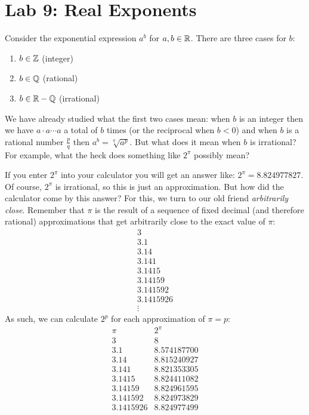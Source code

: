 \documentclass[letterpaper,12pt,fleqn]{article}
\begin{document}
\section*{Lab 9: Real Exponents}

Consider the exponential expression $a^b$ for $a,b\in\mathbb{R}$. There are three cases
for $b$:
\begin{enumerate}
\item $b\in\mathbb{Z}$ (integer)
\item $b\in\mathbb{Q}$ (rational)
\item $b\in\mathbb{R}-\mathbb{Q}$ (irrational)
\end{enumerate}

We have already studied what the first two cases mean: when $b$ is an integer
then we have $a\cdot a\cdots a$ a total of $b$ times (or the reciprocal when
$b<0$) and when $b$ is a rational number $\frac{p}{q}$ then
$a^b=\sqrt[q]{a^p}$. But what does it mean when $b$ is irrational? For example,
what the heck does something like $2^\pi$ possibly mean?

If you enter $2^\pi$ into your calculator you will get an answer like:
$2^\pi=8.824977827$. Of course, $2^\pi$ is irrational, so this is just an
approximation. But how did the calculator come by this answer? For this, we
turn to our old friend \emph{arbitrarily close}. Remember that $\pi$ is the
result of a sequence of fixed decimal (and therefore rational) approximations
that get arbitrarily close to the exact value of $\pi$:
\[\begin{array}{l}
3 \\
3.1 \\
3.14 \\
3.141 \\
3.1415 \\
3.14159 \\
3.141592 \\
3.1415926 \\
\vdots
\end{array}\]
As such, we can calculate $2^p$ for each approximation of $\pi=p$:
\[\begin{array}{l|l}
\pi & 2^\pi \\
\hline
3 & 8 \\
3.1 & 8.574187700 \\
3.14 & 8.815240927 \\
3.141 & 8.821353305 \\
3.1415 & 8.824411082 \\
3.14159 & 8.824961595 \\
3.141592 & 8.824973829 \\
3.1415926 & 8.824977499
\end{array}\]
\end{document}
